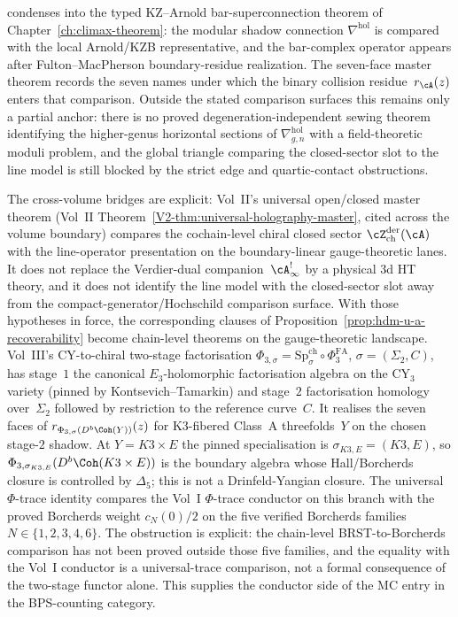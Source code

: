 \begin{remark}
\begin{enumerate}[label=\textup{(W\arabic*)}]
 condenses into the typed KZ--Arnold bar-superconnection theorem of
 Chapter~\ref{ch:climax-theorem}: the modular shadow connection
 $\nabla^{\mathrm{hol}}$ is compared with the local Arnold/KZB
 representative, and the bar-complex operator appears after
 Fulton--MacPherson boundary-residue realization.  The seven-face
 master theorem records the seven names under which the binary
 collision residue~$r_\cA(z)$ enters that comparison. Outside the
 stated comparison surfaces this remains
only a partial anchor: there is no proved degeneration-independent
sewing theorem identifying the higher-genus horizontal sections of
$\nabla^{\mathrm{hol}}_{g,n}$ with a field-theoretic moduli problem, and the
global triangle comparing the closed-sector slot to the line model is still
blocked by the strict edge and quartic-contact obstructions.
\end{enumerate}
The cross-volume bridges are explicit:
Vol~II's universal open/closed master theorem
(Vol~II Theorem~\ref{V2-thm:universal-holography-master}, cited
across the volume boundary) compares the cochain-level chiral closed sector
$\cZ^{\mathrm{der}}_{\mathrm{ch}}(\cA)$ with the line-operator
presentation on the boundary-linear gauge-theoretic lanes. It does
not replace the Verdier-dual companion~$\cA^{!}_\infty$ by a physical
3d HT theory, and it does not identify the line model with the closed-sector
slot away from the compact-generator/Hochschild comparison surface.
With those hypotheses in force, the corresponding clauses of
Proposition~\ref{prop:hdm-u-a-recoverability} become chain-level
theorems on the gauge-theoretic landscape. Vol~III's CY-to-chiral
two-stage factorisation
$\Phi_{3,\sigma} =
\mathrm{Sp}^{\mathrm{ch}}_{\sigma}\circ\Phi^{\mathrm{FA}}_3$,
$\sigma=(\Sigma_2,C)$, has stage~$1$ the canonical
$E_3$-holomorphic factorisation algebra on the CY$_3$ variety
\textup{(}pinned by Kontsevich--Tamarkin\textup{)} and stage~$2$
factorisation homology over~$\Sigma_2$ followed by restriction to the
reference curve~$C$. It realises the seven faces of
$r_{\Phi_{3,\sigma}(D^b\Coh(Y))}(z)$ for K3-fibered Class~A
threefolds~$Y$ on the chosen stage-$2$ shadow. At
$Y=K3\times E$ the pinned specialisation is
$\sigma_{K3,E}=(K3,E)$, so
$\Phi_{3,\sigma_{K3,E}}(D^b\Coh(K3\times E))$ is the boundary
algebra whose Hall/Borcherds closure is controlled by $\Delta_5$; this
is not a Drinfeld-Yangian closure. The universal
$\Phi$-trace identity compares the Vol~I $\Phi$-trace conductor on
this branch with the proved Borcherds weight $c_N(0)/2$ on the five
verified Borcherds families $N \in \{1,2,3,4,6\}$. The obstruction is
explicit: the chain-level BRST-to-Borcherds comparison has not been
proved outside those five families, and the equality with the
Vol~I conductor is a universal-trace comparison, not a formal
consequence of the two-stage functor alone. This supplies the
conductor side of the MC entry in the BPS-counting category.
\end{remark}

